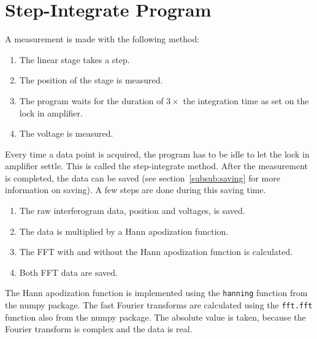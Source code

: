 
\section{Step-Integrate Program}


A measurement is made with the following method:

 \begin{enumerate}
  \item The linear stage takes a step.
  \item The position of the stage is measured.
  \item The program waits for the duration of $3\times$ the integration time as set on the lock in amplifier.
  \item The voltage is measured.
 \end{enumerate}

Every time a data point is acquired, the program has to be idle to let the lock in amplifier settle. This is called the step-integrate method. After the measurement is completed, the data can be saved (see section~\ref{subsub:saving} for more information on saving). A few steps are done during this saving time.

\begin{enumerate}
 \item The raw interferogram data, position and voltages, is saved.
 \item The data is multiplied by a Hann apodization function.
 \item The FFT with and without the Hann apodization function is calculated.
 \item Both FFT data are saved.
\end{enumerate}

The Hann apodization function is implemented using the \verb!hanning! function from the numpy package. The fast Fourier transforms are calculated using the \verb!fft.fft! function also from the numpy package. The absolute value is taken, because the Fourier transform is complex and the data is real.

